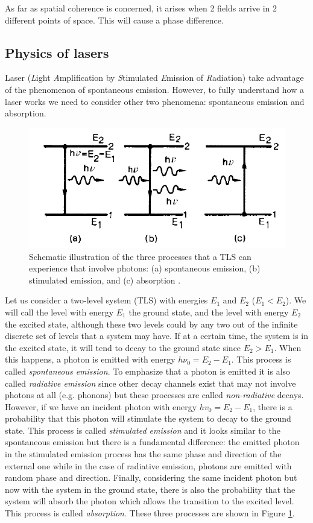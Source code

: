 \documentclass[11pt,a4paper]{article}
\begin{document}
As far as spatial coherence is concerned, it arises when 2 fields arrive in 2 different points of space. This will cause a phase difference.

\subsection{Physics of lasers}

Laser (\emph{L}ight \emph{A}mplification by \emph{S}timulated \emph{E}mission of \emph{R}adiation) take advantage of the phenomenon of spontaneous emission. However, to fully understand how a laser works we need to consider other two phenomena: spontaneous emission and absorption.

\begin{figure}[ht]
\centering
\includegraphics[width=.7\textwidth]{TLS}
\caption{Schematic illustration of the three processes that a TLS can experience that involve photons: (a) spontaneous emission, (b) stimulated emission, and (c) absorption \cite{svelto2010principles}.}
\label{fig:2LS}
\end{figure}


Let us consider a two-level system (TLS) with energies $E_1$ and $E_2$ ($E_1<E_2$). We will call the level with energy $E_1$ the ground state, and the level with energy $E_2$ the excited state, although these two levels could by any two out of the infinite discrete set of levels that a system may have. If at a certain time, the system is in the excited state, it will tend to decay to the ground state since $E_2>E_1$. When this happens, a photon is emitted with energy $h\nu_0=E_2-E_1$. This process is called \emph{spontaneous emission}. To emphasize that a photon is emitted it is also called \emph{radiative emission} since other decay channels exist that may not involve photons at all (e.g. phonons) but these processes are called \emph{non-radiative} decays. However, if we have an incident photon with energy $hv_0=E_2-E_1$, there is a probability that this photon will stimulate the system to decay to the ground state. This process is called \emph{stimulated emission} and it looks similar to the spontaneous emission but there is a fundamental difference: the emitted photon in the stimulated emission process has the same phase and direction of the external one while in the case of radiative emission, photons are emitted with random phase and direction. Finally, considering the same incident photon but now with the system in the ground state, there is also the probability that the system will absorb the photon which allows the transition to the excited level. This process is called \emph{absorption}. These three processes are shown in Figure \ref{fig:2LS}.
\end{document}
